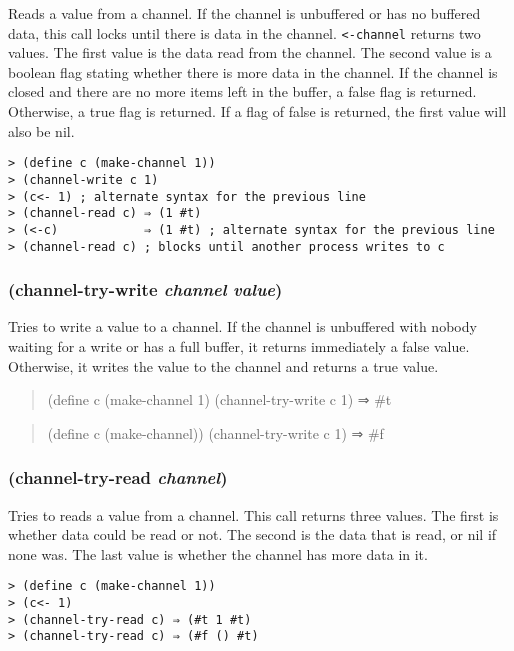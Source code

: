 \documentclass{article}
\begin{document}
Reads a value from a channel. If the channel is unbuffered or has no buffered data, this call
locks until there is data in the channel. \verb|<-channel| returns two values. The
first value is the data read from the channel. The second value is a boolean flag stating
whether there is more data in the channel. If the channel is closed and there are no more
items left in the buffer, a false flag is returned. Otherwise, a true flag is returned. If a
flag of false is returned, the first value will also be nil.

\begin{verbatim}
> (define c (make-channel 1))
> (channel-write c 1)
> (c<- 1) ; alternate syntax for the previous line
> (channel-read c) ⇒ (1 #t)
> (<-c)            ⇒ (1 #t) ; alternate syntax for the previous line
> (channel-read c) ; blocks until another process writes to c
\end{verbatim}

\subsubsection{(channel-try-write \emph{channel} \emph{value})}

Tries to write a value to a channel. If the channel is unbuffered with nobody waiting for a
write or has a full buffer, it returns immediately a false value. Otherwise, it writes the
value to the channel and returns a true value.

\begin{quote}
(define c (make-channel 1)
(channel-try-write c 1) ⇒ \#t
\end{quote}

\begin{quote}
(define c (make-channel))
(channel-try-write c 1) ⇒ \#f
\end{quote}

\subsubsection{(channel-try-read \emph{channel})}

Tries to reads a value from a channel. This call returns three values. The first is whether
data could be read or not. The second is the data that is read, or nil if none was. The last
value is whether the channel has more data in it.

\begin{verbatim}
> (define c (make-channel 1))
> (c<- 1)
> (channel-try-read c) ⇒ (#t 1 #t)
> (channel-try-read c) ⇒ (#f () #t)
\end{verbatim}
\end{document}
